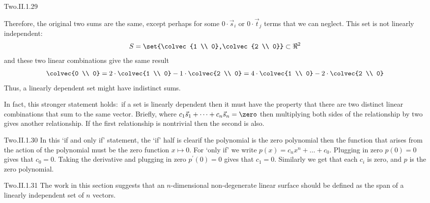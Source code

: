 \begin{ans}{Two.II.1.29}
\begin{exparts}
          Therefore, the original two sums are the same, except perhaps for
          some $0\cdot\vec{s}_i$ or $0\cdot\vec{t}_j$ terms that we can
          neglect.
        \partsitem
          This set is not linearly independent:
          \begin{equation*}
            S=\set{\colvec{1 \\ 0},\colvec{2 \\ 0}}\subset\Re^2
          \end{equation*}
          and these two linear combinations give the same result
          \begin{equation*}
            \colvec{0 \\ 0}=2\cdot\colvec{1 \\ 0}-1\cdot\colvec{2 \\ 0}
                            =4\cdot\colvec{1 \\ 0}-2\cdot\colvec{2 \\ 0}
          \end{equation*}
          Thus, a linearly dependent set might have indistinct sums.

          In fact, this stronger statement holds:~if a set is linearly
          dependent then it must have the property that there are two
          distinct linear combinations that sum to the same vector.
          Briefly, where \( c_1\vec{s}_1+\dots+c_n\vec{s}_n=\zero \) then
          multiplying both sides of the relationship by two gives another
          relationship.
          If the first relationship is nontrivial then the second is also.
      \end{exparts}
    
\end{ans}
\begin{ans}{Two.II.1.30}
       In this `if and only if' statement, the `if' half is clear\Dash if
       the polynomial is the zero polynomial then the function that arises
       from the action of the polynomial must be the zero
       function $x\mapsto 0$.
       For `only if' we write $p(x)=c_nx^n+\dots+c_0$.
       Plugging in zero $p(0)=0$ gives that $c_0=0$.
       Taking the derivative and plugging in zero $p^\prime(0)=0$ gives
       that $c_1=0$.
       Similarly we get that each $c_i$ is zero, and $p$ is the zero
       polynomial.
     
\end{ans}
\begin{ans}{Two.II.1.31}
      The work in this section suggests that an \( n \)-dimensional
      non-degenerate linear surface should be defined as the span of a linearly
      independent set of \( n \) vectors.
    
\end{ans}

